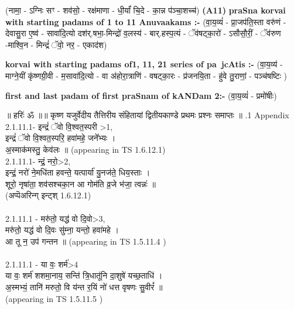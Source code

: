 \documentclass[17pt]{extarticle}
\begin{document}
                  \newline
                       (नामा॒ - ऽग्निः सꣳ - शव॑सो॒ - रक्ष॑माणा - धी॒र्यां॑ चि॒दे - का॒न्न प॑ञ्चा॒शच्च॑)  \textbf{(A11)} \newline \newline
                \textbf{praSna korvai with starting padams of 1 to 11 Anuvaakams :-} \newline
        (वा॒य॒व्यं॑ - प्रा॒जप॑ति॒स्ता वरु॑णं - देवासु॒रा ए॒ष्व॑ - सावा॑दि॒त्यो दश॑र्.षभा॒-मिन्द्रो॑ व॒लस्य॑ - बार्.हस्प॒त्यं - ॅव॑षट्का॒रो॑ - ऽसौसौ॒रीं॒ - ॅव॑रुण -माश्वि॒न - मिन्द्रं॑ ॅवो॒ नर॒ - एकाद॑श) \newline

        \textbf{korvai with starting padams of1, 11, 21 series of pa~jcAtis :-} \newline
        (वा॒य॒व्य॑ - माग्ने॒यीं कृ॑ष्णग्री॒वी - म॒सावा॑दि॒त्यो - वा अ॑होरा॒त्राणि॑ - वषट्का॒रः - प्र॑जनयि॒ता - हु॑वे तु॒राणां॒ - पञ्च॑षष्टिः ) \newline

        \textbf{first and last padam of first praSnam of kANDam 2:-} \newline
        (वा॒य॒व्यं॑ - प्रमो॑षीः) \newline 

        
        ॥ हरिः॑ ॐ ॥॥ कृष्ण यजुर्वेदीय तैत्तिरीय संहितायां द्वितीयकाण्डे प्रथमः प्रश्नः समाप्तः ॥ \newline
        .1   Appendix\\2.1.11.1- इन्द्रं॑ ॅवो वि॒श्वत॒स्परी >1, \\इन्द्रं॑ ॅवो वि॒श्वत॒स्परि॒ हवा॑महे॒ जने᳚भ्यः । \\अ॒स्माक॑मस्तु॒ केव॑लः ॥ (appearing in TS 1.6.12.1)\\2.1.11.1- न्द्रं॒ नरो॒>2, \\इन्द्रं॒ नरो॑ ने॒मधि॑ता हवन्ते॒ यत्पार्या॑ यु॒नज॑ते॒ धिय॒स्ताः ।\\शूरो॒ नृषा॑ता॒ शव॑सश्चका॒न आ गोम॑ति व्र॒जे भ॑जा॒ त्वन्नः॑ ॥\\(अप्पॆअरिन्ग् इन्ट्श् 1.6.12.1)\\\\2.1.11.1 - मरु॑तो॒ यद्ध॑ वो दि॒वो>3, \\मरु॑तो॒ यद्ध॑ वो दि॒वः सु॑म्ना॒ यन्तो॒ हवा॑महे । \\आ तू न॒ उप॑ गन्तन ॥ (appearing in TS 1.5.11.4 )\\\\2.1.11.1 - या वः॒ शर्म॑>4\\या वः॒ शर्म॑ शशमा॒नाय॒ सन्ति॑ त्रि॒धातू॑नि दा॒शुषे॑ यच्छ॒ताधि॑ । \\अ॒स्मभ्यं॒ तानि॑ मरुतो॒ वि य॑न्त र॒यिं नो॑ धत्त वृषणः सु॒वीरं᳚ ॥\\(appearing in TS 1.5.11.5 ) \\
                \pagebreak
        
\end{document}
